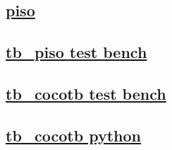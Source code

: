 \documentclass{article}
\begin{document}
  


  \subsection{\href{../files/piso-v.html}{piso}}
  \subsection{\href{../files2/tb_piso-v.html}{tb\_piso test bench}}
  \subsection{\href{../files2/tb_cocotb-v.html}{tb\_cocotb test bench}}
  \subsection{\href{../files2/tb_cocotb-py.html}{tb\_cocotb python}}
\end{document}
